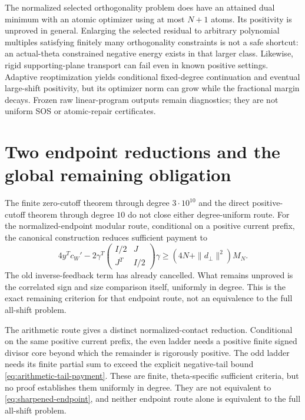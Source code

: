 \documentclass[11pt]{article}
\theoremstyle{definition}
\theoremstyle{remark}
\begin{document}
The normalized selected orthogonality problem does have an attained dual
minimum with an atomic optimizer using at most $N+1$ atoms. Its positivity is
unproved in general. Enlarging the selected residual to arbitrary polynomial
multiples satisfying finitely many orthogonality constraints is not a safe
shortcut: an actual-theta constrained negative energy exists in that larger
class. Likewise, rigid supporting-plane transport can fail even in known
positive settings. Adaptive reoptimization yields conditional fixed-degree
continuation and eventual large-shift positivity, but its optimizer norm can
grow while the fractional margin decays. Frozen raw linear-program outputs
remain diagnostics; they are not uniform SOS or atomic-repair certificates.

\section{Two endpoint reductions and the global remaining obligation}

The finite zero-cutoff theorem through degree $3\cdot10^{10}$ and the direct
positive-cutoff theorem through degree $10$ do not close either degree-uniform
route. For
the normalized-endpoint modular route, conditional on a positive current prefix,
the canonical construction reduces sufficient payment to
\begin{equation}
 4y^Tc_W'-2\gamma^T
 \begin{pmatrix}I/2&J\\J^T&I/2\end{pmatrix}\gamma
 \ge (4N+\|d_\perp\|^2)M_N.
 \label{eq:sharpened-endpoint}
\end{equation}
The old inverse-feedback term has already cancelled. What remains unproved is
the correlated sign and size comparison itself, uniformly in degree. This is
the exact remaining criterion for that endpoint route, not an equivalence to
the full all-shift problem.

The arithmetic route gives a distinct normalized-contact reduction. Conditional
on the same positive current prefix, the even ladder needs a positive finite
signed divisor core beyond which the remainder is rigorously positive. The odd
ladder needs its finite partial sum to exceed the explicit negative-tail bound
\eqref{eq:arithmetic-tail-payment}. These are finite, theta-specific sufficient
criteria, but no proof establishes them uniformly in degree. They are not
equivalent to \eqref{eq:sharpened-endpoint}, and neither endpoint route alone is
equivalent to the full all-shift problem.
\end{document}
